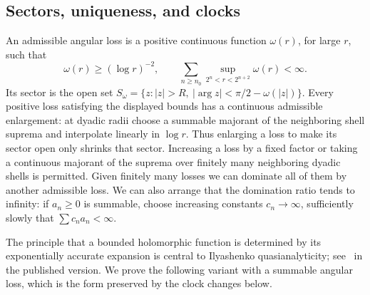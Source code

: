 \subsection{Sectors, uniqueness, and clocks}

\begin{definition}\label{path:def-sector}
An admissible angular loss is a positive continuous function \(\omega(r)\), for large
\(r\), such that
\[
 \omega(r)\ge(\log r)^{-2},\qquad
 \sum_{n\ge n_0}\sup_{2^n<r<2^{n+2}}\omega(r)<\infty.
\]
Its sector is the open set
\(S_\omega=\{z:|z|>R,\ |\arg z|<\pi/2-\omega(|z|)\}\).
Every positive loss satisfying the displayed bounds has a continuous
admissible enlargement: at dyadic radii choose a summable majorant of
the neighboring shell suprema and interpolate linearly in \(\log r\).
Thus enlarging a loss to make its sector open only shrinks that sector.
Increasing a loss by a fixed factor or taking a continuous majorant of
the suprema over finitely many neighboring dyadic shells is permitted.  Given finitely many losses we
can dominate all of them by another admissible loss.  We can also arrange
that the domination ratio tends to infinity: if \(a_n\ge0\) is summable,
choose increasing constants \(c_n\to\infty\), sufficiently slowly that
\(\sum c_na_n<\infty\).
\end{definition}

The principle that a bounded holomorphic function is determined by its
exponentially accurate expansion is central to Ilyashenko
quasianalyticity; see~\cite[Fact~1.5]{SpeisseggerQA} in the published
version. We prove the following variant with a summable angular loss,
which is the form preserved by the clock changes below.

